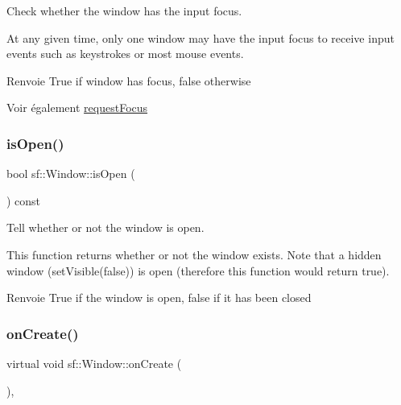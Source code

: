 Check whether the window has the input focus. 

At any given time, only one window may have the input focus to receive input events such as keystrokes or most mouse events.

\begin{DoxyReturn}{Renvoie}
True if window has focus, false otherwise 
\end{DoxyReturn}
\begin{DoxySeeAlso}{Voir également}
\hyperlink{classsf_1_1Window_a58cf7fa1775e8e7542032e3ecfa83b49}{request\+Focus} 
\end{DoxySeeAlso}
\mbox{\label{classsf_1_1Window_ae873503db7d48157bb9cbf6129562bce}} 
\subsubsection{\texorpdfstring{is\+Open()}{isOpen()}}
{\footnotesize\ttfamily bool sf\+::\+Window\+::is\+Open (\begin{DoxyParamCaption}{ }\end{DoxyParamCaption}) const}



Tell whether or not the window is open. 

This function returns whether or not the window exists. Note that a hidden window (set\+Visible(false)) is open (therefore this function would return true).

\begin{DoxyReturn}{Renvoie}
True if the window is open, false if it has been closed 
\end{DoxyReturn}
\mbox{\label{classsf_1_1Window_a106633b9be49b27f83d4712689b493eb}} 
\subsubsection{\texorpdfstring{on\+Create()}{onCreate()}}
{\footnotesize\ttfamily virtual void sf\+::\+Window\+::on\+Create (\begin{DoxyParamCaption}{ }\end{DoxyParamCaption})\hspace{0.3cm}{\ttfamily [protected]}, {\ttfamily [virtual]}}



